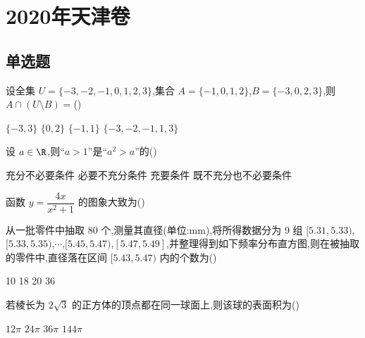 \chapter{2020年天津卷}

\section{单选题}

\begin{problem}
设全集 \(U=\{-3,-2,-1,0,1,2,3\}\),集合 \(A=\{-1,0,1,2\}\),\(B=\{-3,0,2,3\}\),则 \(A\cap\left( U\setminus B \right)=\)(\quad)

\choices
    {\(\{-3,3\}\)}
    {\(\{0,2\}\)}
    {\(\{-1,1\}\)}
    {\(\{-3,-2,-1,1,3\}\)}
\end{problem}

\begin{problem}
设 \(a\in\R\),则``\(a>1\)''是``\(a^2>a\)''的(\quad)

\choices
    {充分不必要条件}
    {必要不充分条件}
    {充要条件}
    {既不充分也不必要条件}
\end{problem}

\begin{problem}
函数 \(y=\dfrac{4x}{x^2+1}\) 的图象大致为(\quad)

\choices
    {}
    {}
    {}
    {}
\end{problem}

\begin{problem}
从一批零件中抽取 80 个,测量其直径(单位:mm),将所得数据分为 9 组 \([5.31,5.33)\),\([5.33,5.35)\),\(\cdots\),\([5.45,5.47)\),\([5.47,5.49]\),并整理得到如下频率分布直方图,则在被抽取的零件中,直径落在区间 \([5.43,5.47)\) 内的个数为(\quad)

\begin{center}
\end{center}

\choices
    {10}
    {18}
    {20}
    {36}
\end{problem}

\begin{problem}
若棱长为 \(2\sqrt3\) 的正方体的顶点都在同一球面上,则该球的表面积为(\quad)

\choices
    {\(12\pi\)}
    {\(24\pi\)}
    {\(36\pi\)}
    {\(144\pi\)}
\end{problem}


